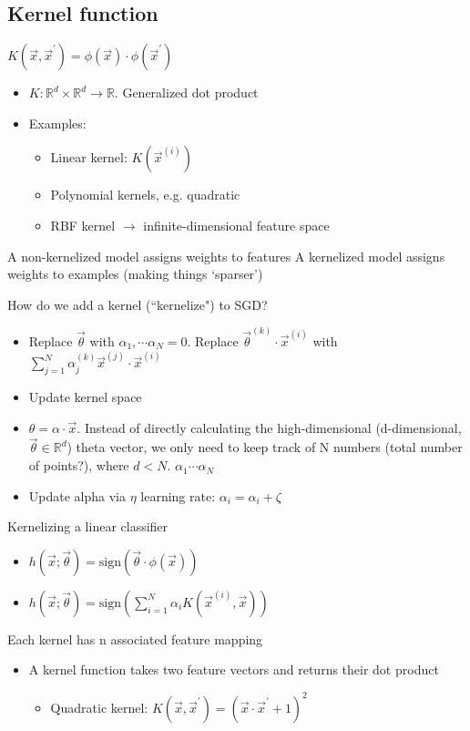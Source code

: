 \documentclass[10pt, oneside]{article}
\newcommand{\R}{\mathbb{R}}
\begin{document}
\subsection{Kernel function}
$K(\vec x, \vec x^\prime)=\phi(\vec x)\cdot \phi (\vec x^\prime)$
\begin{itemize}
    \item $K: \R^d \times \R^d \rightarrow \R$. Generalized dot product
    \item Examples:
    \begin{itemize}
        \item Linear kernel: $K(\vec x^{(i)})$
        \item Polynomial kernels, e.g. quadratic
        \item RBF kernel $\rightarrow$ infinite-dimensional feature space
    \end{itemize}
\end{itemize}

A non-kernelized model assigns weights to features
A kernelized model assigns weights to examples (making things `sparser')

How do we add a kernel (``kernelize") to SGD?
\begin{itemize}
    \item Replace $\vec \theta$ with $\alpha_1, \cdots \alpha_N =0$. Replace $\vec \theta^{(k)} \cdot \vec x ^{(i)}$ with $\sum_{j=1}^N \alpha_j ^{(k)} \vec x^{(j)} \cdot\vec x^{(i)}$
    \item Update kernel space
    \item $\theta = \alpha \cdot \vec x$. Instead of directly calculating the high-dimensional (d-dimensional, $\vec \theta \in \R^d$) theta vector, we only need to keep track of N numbers (total number of points?), where $d<N$. $\alpha_1 \cdots \alpha_N$
    \item Update alpha via $\eta$ learning rate: $\alpha_i = \alpha_i + \zeta$
\end{itemize}
Kernelizing a linear classifier
\begin{itemize}
    \item $h(\vec x; \vec \theta) = \text{sign}(\vec \theta \cdot \phi(\vec x))$
    \item $h(\vec x; \vec \theta)=\text{sign}(\sum_{i=1} ^N \alpha_i K(\vec x^{(i)}, \vec x))$
\end{itemize}

Each kernel has n associated feature mapping
\begin{itemize}
    \item A kernel function takes two feature vectors and returns their dot product
    \begin{itemize}
        \item Quadratic kernel: $K(\vec x, \vec x^\prime)=(\vec x\cdot \vec x^\prime + 1)^2$
    \end{itemize}
\end{itemize}
\end{document}
